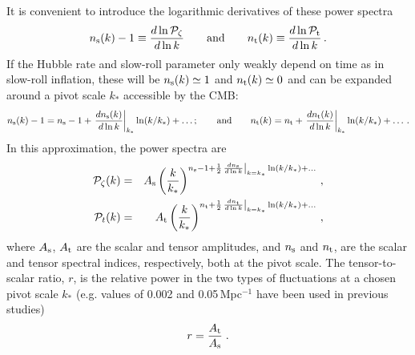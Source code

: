 It is convenient to introduce the logarithmic derivatives of these power spectra 
\begin{equation}\label{eq:specind}
n_{\rm s}(k)-1\equiv\frac{d\ln \mathcal{P}_{\zeta}}{d\ln k}\qquad{\rm and}\qquad n_{\rm t}(k)\equiv \frac{d\ln \mathcal{P}_{\rm t}}{d\ln k}\,.
\end{equation}
If the Hubble rate and slow-roll parameter only weakly depend on time as in slow-roll inflation, these will be $n_{\rm s}(k)\simeq 1$ and $n_{\rm t}(k)\simeq 0$ and can be expanded around a pivot scale $k_\ast$ accessible by the CMB:
\begin{equation}
n_{\rm s}(k)-1=n_{\rm s}-1+\left.\frac{dn_{\rm s}(k)}{d\ln k}\right|_{k_\ast}\ln(k/k_\ast)+\dots; \qquad{\rm and}\qquad n_{\rm t}(k)=n_{\rm t}+\left.\frac{dn_{\rm t}(k)}{d\ln k}\right|_{k_\ast}\ln(k/k_\ast)+\dots \,.
\end{equation}
In this approximation, the power spectra are
\begin{eqnarray}\label{eq:power_spectra_power_law}
\mathcal{P}_{\zeta}(k)&=& A_{\rm s}\left(\frac{k}{k_\ast}\right)^{n_{\rm s}-1+\frac{1}{2}\left.\frac{dn_{\rm s}}{d\ln k}\right|_{k=k_\ast}\ln(k/k_\ast)+\dots}\,,\nonumber\\
\mathcal{P}_{t}(k)&=& A_{\rm t} \left(\frac{k}{k_\ast}\right)^{n_{\rm t}+\frac{1}{2}\left.\frac{dn_{\rm t}}{d\ln k}\right|_{k=k_\ast}\ln(k/k_\ast)+\dots}\,,
\end{eqnarray}
where $A_{\rm s}$, $A_{\rm t}$ are the scalar and tensor amplitudes, and $n_{\rm s}$ and $n_{\rm t}$, are the scalar and tensor spectral indices, respectively, both at the pivot scale. 
The tensor-to-scalar ratio, $r$, is the relative power in the two types of fluctuations at a chosen pivot scale $k_\ast$ (e.g. values of 0.002 and
0.05\,Mpc$^{-1}$ have been used in previous studies)
\begin{equation}
r=\frac{A_{\rm t}}{A_{\rm s}}\;.
\end{equation}

